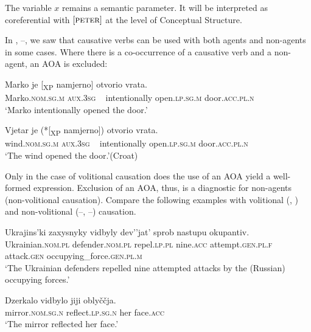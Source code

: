 \documentclass[output=paper]{langscibook}
\begin{document}
\noindent The variable $x$ remains a semantic parameter. It will be interpreted as coreferential with $[\textsc{peter}]$ at the level of Conceptual Structure.

In , --, we saw that causative verbs can be used with both agents and non-agents in some cases. Where there is a co-occurrence of a causative verb and a non-agent, an AOA is excluded:

\ea%
    \label{ex:junghanns:63}
  \ea \gll   Marko je [\textsubscript{XP} namjerno] otvorio vrata.\\
    Marko.\textsc{nom.sg.m} \textsc{aux.3sg} ~ intentionally open.\textsc{lp.sg.m} door.\textsc{acc.pl.n}\\
    \glt ‘Marko intentionally opened the door.’

  \ex \gll     Vjetar  je (*[\textsubscript{XP} namjerno]) otvorio vrata.\\
      wind.\textsc{nom.sg.m} \textsc{aux.3sg} ~ intentionally open.\textsc{lp.sg.m} door.\textsc{acc.pl.n}\\
    \glt ‘The wind opened the door.’\hfill (Croat)
\z
\z

\noindent Only in the case of volitional causation does the use of an AOA yield a well-formed expression. Exclusion of an AOA, thus, is a diagnostic for non-agents (non-volitional causation). Compare the following examples with volitional (, ) and non-volitional (--, --) causation.

\ea%
    \label{ex:junghanns:64}
  \ea \gll   Ukrajins'ki zaxysnyky vidbyly dev’’jat’ sprob nastupu okupantiv.\\
    Ukrainian.\textsc{nom.pl} defender.\textsc{nom.pl} repel.\textsc{lp.pl} nine.\textsc{acc} attempt.\textsc{gen.pl.f} attack.\textsc{gen} occupying\_force.\textsc{gen.pl.m}\\
    \glt ‘The Ukrainian defenders repelled nine attempted attacks by the (Russian) occupying forces.’\label{ex:junghanns:64a}

  \ex \gll   Dzerkalo vidbylo jiji oblyččja.\\
    mirror.\textsc{nom.sg.n} reflect.\textsc{lp.sg.n} her face.\textsc{acc}\\
\glt ‘The mirror reflected her face.’\label{ex:junghanns:64b}
\end{document}
